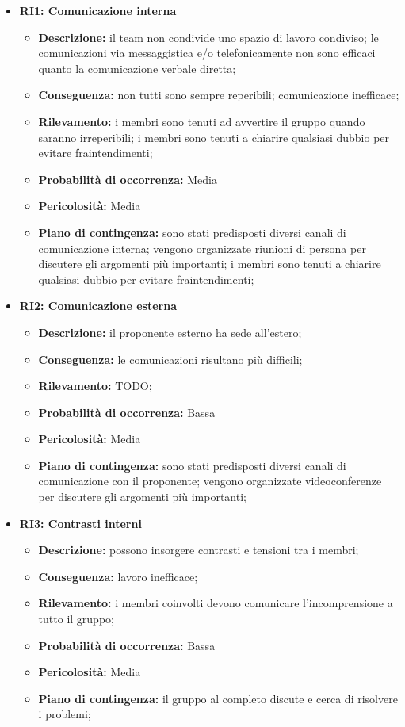 \begin{itemize}
	\item \textbf{RI1: Comunicazione interna}
	\begin{itemize}
		\item \textbf{Descrizione:} il team non condivide uno spazio di lavoro condiviso; le comunicazioni via messaggistica e/o telefonicamente non sono efficaci quanto la comunicazione verbale diretta;
		\item \textbf{Conseguenza:} non tutti sono sempre reperibili; comunicazione inefficace;
		\item \textbf{Rilevamento:} i membri sono tenuti ad avvertire il gruppo quando saranno irreperibili; i membri sono tenuti a chiarire qualsiasi dubbio per evitare fraintendimenti;
		\item \textbf{Probabilità di occorrenza:} Media
		\item \textbf{Pericolosità:} Media
		\item \textbf{Piano di contingenza:} sono stati predisposti diversi canali di comunicazione interna; vengono organizzate riunioni di persona per discutere gli argomenti più importanti; i membri sono tenuti a chiarire qualsiasi dubbio per evitare fraintendimenti;
	\end{itemize}
	
	\item \textbf{RI2: Comunicazione esterna}
	\begin{itemize}
		\item \textbf{Descrizione:} il proponente esterno ha sede all'estero;
		\item \textbf{Conseguenza:} le comunicazioni risultano più difficili;
		\item \textbf{Rilevamento:} TODO;
		\item \textbf{Probabilità di occorrenza:} Bassa
		\item \textbf{Pericolosità:} Media
		\item \textbf{Piano di contingenza:} sono stati predisposti diversi canali di comunicazione con il proponente; vengono organizzate videoconferenze per discutere gli argomenti più importanti;
	\end{itemize}
	
	\item \textbf{RI3: Contrasti interni}
	\begin{itemize}
		\item \textbf{Descrizione:} possono insorgere contrasti e tensioni tra i membri;
		\item \textbf{Conseguenza:} lavoro inefficace;
		\item \textbf{Rilevamento:} i membri coinvolti devono comunicare l'incomprensione a tutto il gruppo;
		\item \textbf{Probabilità di occorrenza:} Bassa
		\item \textbf{Pericolosità:} Media
		\item \textbf{Piano di contingenza:} il gruppo al completo discute e cerca di risolvere i problemi;
	\end{itemize}
	

\end{itemize}
